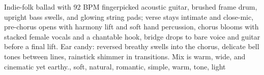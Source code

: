 
\begin{notes}
\end{notes}

\begin{style}
Indie-folk ballad with 92 BPM fingerpicked acoustic guitar, brushed frame drum, upright bass swells, and glowing string pads; verse stays intimate and close-mic, pre-chorus opens with harmony lift and soft hand percussion, chorus blooms with stacked female vocals and a chantable hook, bridge drops to bare voice and guitar before a final lift. %
Ear candy: reversed breathy swells into the chorus, delicate bell tones between lines, rainstick shimmer in transitions. %
Mix is warm, wide, and cinematic yet earthy., soft, natural, romantic, simple, warm, tone, light
\end{style}

